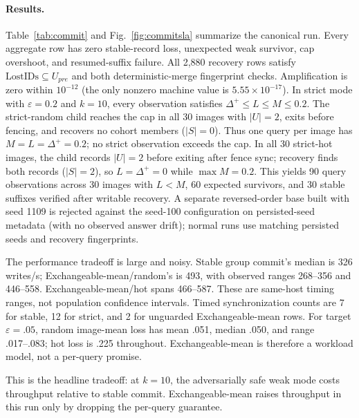 \documentclass[sigconf,nonacm,balance=false]{acmart}
\begin{document}
\paragraph{Results.} Table~\ref{tab:commit} and Fig.~\ref{fig:commitsla} summarize
the canonical run. Every aggregate row has zero stable-record loss, unexpected
weak survivor, cap overshoot, and resumed-suffix failure. All 2{,}880 recovery
rows satisfy $\mathrm{LostIDs}\subseteq U_{pre}$ and both deterministic-merge
fingerprint checks. Amplification is zero within $10^{-12}$ (the only nonzero
machine value is $5.55\times10^{-17}$). In strict mode with $\varepsilon=0.2$
and $k=10$, every observation satisfies $\Delta^+\le L\le M\le0.2$. The
strict-random child reaches the cap in all 30 images with $|U|=2$, exits before
fencing, and recovers no cohort members ($|S|=0$). Thus one query per image has
$M=L=\Delta^+=0.2$; no strict observation exceeds the cap.
In all 30 strict-hot images, the child records $|U|=2$ before exiting after fence
sync; recovery finds both records ($|S|=2$), so $L=\Delta^+=0$ while
$\max M=0.2$. This yields 90 query observations across 30 images with $L<M$,
60 expected survivors, and 30 stable suffixes verified after writable recovery.
A separate reversed-order base built with seed 1109 is rejected against the
seed-100 configuration on persisted-seed metadata (with no observed answer
drift); normal runs use matching persisted seeds and recovery fingerprints.

The performance tradeoff is large and noisy. Stable group commit's median is
326 writes/s; Exchangeable-mean/random's is 493, with observed ranges 268--356
and 446--558. Exchangeable-mean/hot spans 466--587. These are same-host timing
ranges, not population confidence intervals. Timed synchronization
counts are 7 for stable, 12 for strict, and 2 for unguarded Exchangeable-mean rows.
For target $\varepsilon=.05$, random image-mean loss has mean .051, median .050,
and range .017--.083; hot loss is .225 throughout. Exchangeable-mean is therefore
a workload model, not a per-query promise.

This is the headline tradeoff: at $k=10$, the adversarially safe weak mode costs
throughput relative to stable commit. Exchangeable-mean raises throughput in
this run only by dropping the per-query guarantee.
\end{document}

